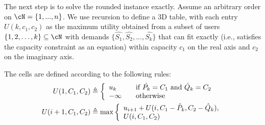 The next step is to solve the rounded instance exactly. Assume an arbitrary order on $\cN = \{ 1, ..., n\}$. We use recursion to define a 3D table, with each entry ${U}(k,c_1, c_2)$ as the maximum utility obtained from a subset of users $\{1,2,\dots,k\} \subseteq \cN$ with demands $\{\hat{S_1},\hat{S_2},...,\hat{S_k}\}$ that can fit exactly (i.e., satisfies the capacity constraint as an equation) within capacity $c_1$ on the real axis and $c_2$ on the imaginary axis. 

The cells are defined according to the following rules:
\begin{align}
{U}(1,C_1, C_2) &\triangleq  \left\{ \begin{array}{l l}
u_k & \quad \text{if $\hat{P_k} = C_1$ and $\hat Q_k  = C_2$}\\
-\infty &\quad \text{otherwise} \end{array}\right.\label{eq:dyn-rule1}\\
{U}(i+1,C_1, C_2) &\triangleq \max  \left\{ \begin{array}{l}
u_{i+1} + {U}(i, C_1 - \hat P_k, C_2 - \hat Q_k),\\
{U}(i,C_1,C_2)
 \end{array}\right.
 \label{eq:dyn-rule2}
\end{align}





